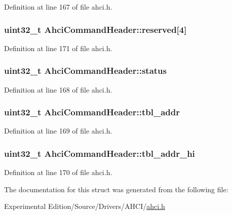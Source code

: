 Definition at line 167 of file ahci.\+h.

\subsubsection[{\texorpdfstring{reserved}{reserved}}]{\setlength{\rightskip}{0pt plus 5cm}uint32\+\_\+t Ahci\+Command\+Header\+::reserved\mbox{[}4\mbox{]}}\hypertarget{structAhciCommandHeader_ab20b140ede005b7d17cc59d961ba2976}{}\label{structAhciCommandHeader_ab20b140ede005b7d17cc59d961ba2976}


Definition at line 171 of file ahci.\+h.

\subsubsection[{\texorpdfstring{status}{status}}]{\setlength{\rightskip}{0pt plus 5cm}uint32\+\_\+t Ahci\+Command\+Header\+::status}\hypertarget{structAhciCommandHeader_aaeb18d131010effc76b3f40a9c06851a}{}\label{structAhciCommandHeader_aaeb18d131010effc76b3f40a9c06851a}


Definition at line 168 of file ahci.\+h.

\subsubsection[{\texorpdfstring{tbl\+\_\+addr}{tbl_addr}}]{\setlength{\rightskip}{0pt plus 5cm}uint32\+\_\+t Ahci\+Command\+Header\+::tbl\+\_\+addr}\hypertarget{structAhciCommandHeader_a9a0af3edb5552ae52039b7f6f9f74abc}{}\label{structAhciCommandHeader_a9a0af3edb5552ae52039b7f6f9f74abc}


Definition at line 169 of file ahci.\+h.

\subsubsection[{\texorpdfstring{tbl\+\_\+addr\+\_\+hi}{tbl_addr_hi}}]{\setlength{\rightskip}{0pt plus 5cm}uint32\+\_\+t Ahci\+Command\+Header\+::tbl\+\_\+addr\+\_\+hi}\hypertarget{structAhciCommandHeader_a92b0f59b1f834422312f180691c76a2e}{}\label{structAhciCommandHeader_a92b0f59b1f834422312f180691c76a2e}


Definition at line 170 of file ahci.\+h.



The documentation for this struct was generated from the following file\+:\begin{DoxyCompactItemize}
\item 
Experimental Edition/\+Source/\+Drivers/\+A\+H\+C\+I/\hyperlink{ahci_8h}{ahci.\+h}\end{DoxyCompactItemize}
